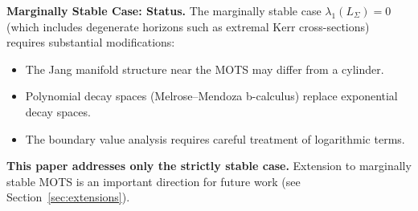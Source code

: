 \textbf{Marginally Stable Case: Status.}
The marginally stable case $\lambda_1(L_\Sigma) = 0$ (which includes degenerate horizons such as extremal Kerr cross-sections) requires substantial modifications:
\begin{itemize}
    \item The Jang manifold structure near the MOTS may differ from a cylinder.
    \item Polynomial decay spaces (Melrose--Mendoza b-calculus) replace exponential decay spaces.
    \item The boundary value analysis requires careful treatment of logarithmic terms.
\end{itemize}
\textbf{This paper addresses only the strictly stable case.} Extension to marginally stable MOTS is an important direction for future work (see Section~\ref{sec:extensions}).
